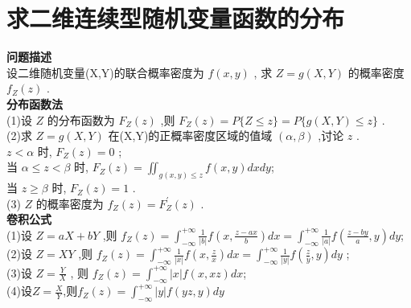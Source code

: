 \documentclass[12pt, a4paper, oneside, UTF8]{ctexbook}
\begin{document}
\section{求二维连续型随机变量函数的分布}
\begin{remark}
\textbf{问题描述}\\
设二维随机变量(X,Y)的联合概率密度为 $f\left( {x,y}\right)$ ,
求 $Z = g\left( {X,Y}\right)$ 的概率密度 ${f}_{Z}\left( z\right)$ .\\
\textbf{分布函数法} \\
(1)设 $Z$ 的分布函数为 ${F}_{Z}\left( z\right)$ ,则 ${F}_{Z}\left( z\right)  = P\{ Z \leq  z\}  = P\{ g\left( {X,Y}\right)  \leq  z\}$ .\\
(2)求 $Z = g\left( {X,Y}\right)$ 在(X,Y)的正概率密度区域的值域 $\left( {\alpha ,\beta }\right)$ ,讨论 $z$ .\\
$z < \alpha$ 时, ${F}_{Z}\left( z\right)  = 0$ ; \\
当 $\alpha  \leq  z < \beta$ 时, ${F}_{Z}\left( z\right)  = {\iint }_{g\left( {x,y}\right)  \leq  z}f\left( {x,y}\right) {dxdy}$; \\
当 $z \geq  \beta$ 时, ${F}_{Z}\left( z\right)  = 1$ .\\
(3) $Z$ 的概率密度为 ${f}_{Z}\left( z\right)  = {F}_{Z}^{\prime }\left( z\right)$ . \\
\textbf{卷积公式}\\
(1)设 $Z = {aX} + {bY}$ ,则 
${f}_{Z}\left( z\right)  = {\int }_{-\infty }^{+\infty }\frac{1}{\left| b\right| }f\left( {x,\frac{z - {ax}}{b}}\right) {dx} = {\int }_{-\infty }^{+\infty }\frac{1}{\left| a\right| }f\left( {\frac{z - {by}}{a},y}\right) {dy}$; \\
(2)设 $Z = {XY}$ ,则 
${f}_{Z}\left( z\right)  = {\int }_{-\infty }^{+\infty }\frac{1}{\left| x\right| }f\left( {x,\frac{z}{x}}\right) {dx} = {\int }_{-\infty }^{+\infty }\frac{1}{\left| y\right| }f\left( {\frac{z}{y},y}\right) {dy}$ ; \\
(3)设 $Z = \frac{Y}{X}$ ,
则 ${f}_{Z}\left( z\right)={\int}_{-\infty}^{+\infty}\left|x\right|f\left({x,{xz}}\right){dx}$; \\
(4)设$Z=\frac{X}{Y}$,则${f}_{Z}\left(z\right)={\int}_{-\infty}^{+\infty}\left|y\right|f\left({{yz},y}\right){dy}$ 
\end{remark}
\end{document}
